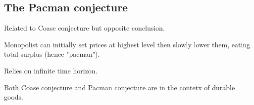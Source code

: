
\subsection{The Pacman conjecture}

Related to Coase conjecture but opposite conclusion.

Monopolist can initially set prices at highest level then slowly lower them, eating total surplus (hence "pacman").

Relies on infinite time horizon.

Both Coase conjecture and Pacman conjecture are in the contetx of durable goods.
